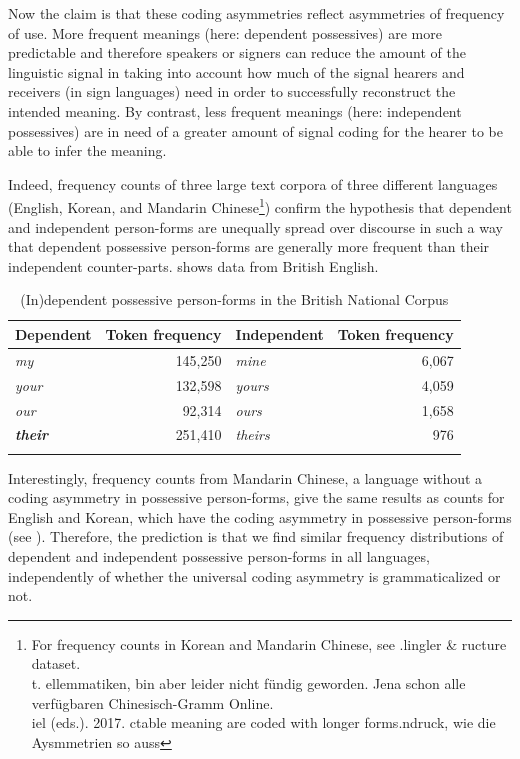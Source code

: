 \documentclass[output=paper]{langsci/langscibook}
\begin{document}
Now the claim is that these coding asymmetries reflect asymmetries of frequency of use. More frequent meanings (here: dependent possessives) are more predictable and therefore speakers or signers can reduce the amount of the linguistic signal in taking into account how much of the signal hearers and receivers (in sign languages) need in order to successfully reconstruct the intended meaning. By contrast, less frequent meanings (here: independent possessives) are in need of a greater amount of signal coding for the hearer to be able to infer the meaning. 

Indeed, frequency counts of three large text corpora of three different languages (English, Korean, and Mandarin Chinese\footnote{For frequency counts in Korean and Mandarin Chinese, see \citealt{Ye2017}.lingler \& ructure dataset. \\
t. ellemmatiken, bin aber leider nicht fündig geworden. Jena schon alle verfügbaren Chinesisch-Gramm Online. \\
iel (eds.). 2017. ctable meaning are coded with longer forms.ndruck, wie die Aysmmetrien so auss}) confirm the hypothesis that dependent and independent person-forms are unequally spread over discourse in such a way that dependent possessive person-forms are generally more frequent than their independent counter-parts.  shows data from British English.

\begin{table}
\begin{tabularx}{\textwidth}{XrXr}
\lsptoprule

\bfseries Dependent & \bfseries Token frequency & \bfseries Independent & \bfseries Token frequency\\
\midrule
\textit{my} & 145,250 & \textit{mine} & 6,067\\
\textit{your} & 132,598 & \textit{yours} & 4,059\\
\textit{our} & 92,314 & \textit{ours} & 1,658\\
\textbf{\textit{their}}{\textbf{\textit{~}}} & 251,410 & \textit{theirs} & 976\\
\lspbottomrule
\end{tabularx}

\caption{(In)dependent possessive person-forms in the British National Corpus}
\label{tab:michaelis:2}
\end{table}

Interestingly, frequency counts from Mandarin Chinese, a language without a coding asymmetry in possessive person-forms, give the same results as counts for English and Korean, which have the coding asymmetry in possessive person-forms (see \citealt{Ye2017}). Therefore, the prediction is that we find similar frequency distributions of dependent and independent possessive person-forms in all languages, independently of whether the universal coding asymmetry is grammaticalized or not.
\end{document}
